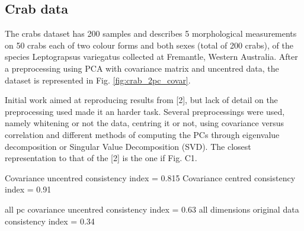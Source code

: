 \subsection{Crab data}

The crabs dataset has 200 samples and describes 5 morphological measurements on 50 crabs each of two colour forms and both sexes (total of 200 crabs), of the species Leptograpsus variegatus collected at Fremantle, Western Australia. After a preprocessing using PCA with covariance matrix and uncentred data, the dataset is represented in Fig. \ref{fig:crab_2pc_covar}.%






Initial work aimed at reproducing results from [2], but lack of detail on the preprocessing used made it an harder task. Several preprocessings were used, namely whitening or not the data, centring it or not, using covariance versus correlation and different methods of computing the PCs through eigenvalue decomposition or Singular Value Decomposition (SVD). The closest representation to that of the [2] is the one if Fig. C1.



Covariance uncentred consistency index = 0.815
Covariance centred consistency index = 0.91

all pc covariance uncentred consistency index = 0.63
all dimensions original data consistency index = 0.34